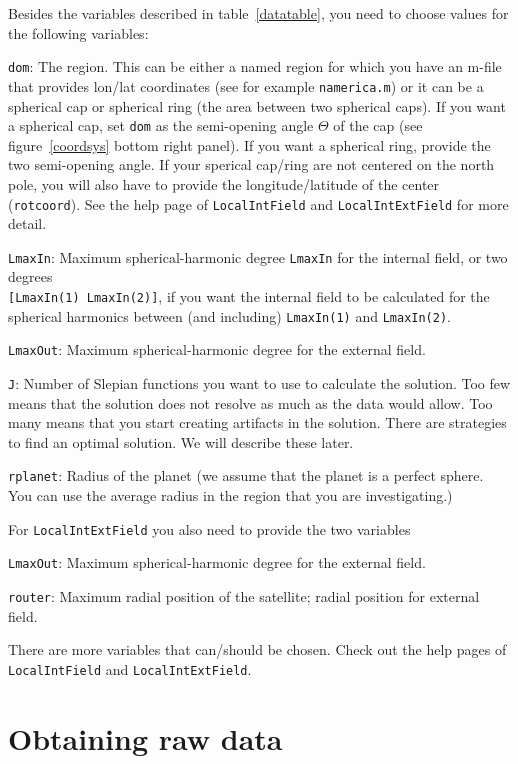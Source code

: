\documentclass[11pt]{article}
\begin{document}
Besides the variables described in table~\ref{datatable}, you need to
choose values for the following variables:

\texttt{dom}: The region. This can be either a named region for which
you have an m-file that provides lon/lat coordinates (see for example
\texttt{namerica.m}) or it can be a spherical cap or spherical ring
(the area between two spherical caps). If you want a spherical cap,
set \texttt{dom} as the semi-opening angle $\Theta$ of the cap (see
figure~\ref{coordsys} bottom right panel). If you want a spherical
ring, provide the two semi-opening angle. If your sperical cap/ring
are not centered on the north pole, you will also have to provide the
longitude/latitude of the center (\texttt{rotcoord}). See the help
page of \texttt{LocalIntField} and \texttt{LocalIntExtField} for more
detail.

\texttt{LmaxIn}: Maximum spherical-harmonic degree \verb+LmaxIn+
for the internal field, or two degrees\\ \verb+[LmaxIn(1) LmaxIn(2)]+, if
you want the internal field to be calculated for the spherical
harmonics between (and including) \verb+LmaxIn(1)+ and \verb+LmaxIn(2)+.

\texttt{LmaxOut}: Maximum spherical-harmonic degree for the external
field.

\texttt{J}: Number of Slepian functions you want to use to calculate
the solution. Too few means that the solution does not resolve as much
as the data would allow. Too many means that you start creating
artifacts in the solution. There are strategies to find an optimal
solution. We will describe these later.

\texttt{rplanet}: Radius of the planet (we assume that the planet is a
perfect sphere. You can use the average radius in the region that you
are investigating.) 

For \verb+LocalIntExtField+ you also need to provide the two variables


\texttt{LmaxOut}: Maximum spherical-harmonic degree for the external
field.

\texttt{router}: Maximum radial position of the satellite; radial
position for external field.

There are more variables that can/should be chosen. Check out the help
pages of \texttt{LocalIntField} and \texttt{LocalIntExtField}.


\section{Obtaining raw data}
\end{document}
